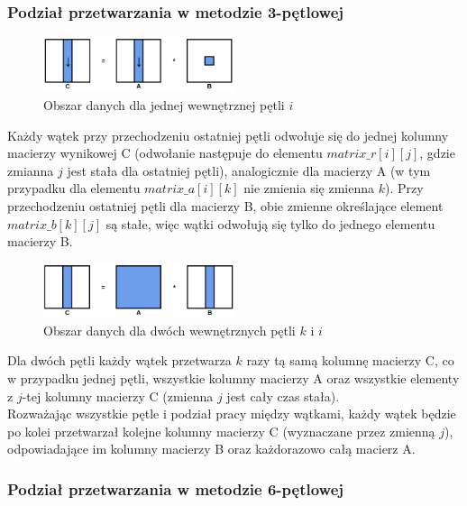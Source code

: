 \documentclass[10pt,a4paper]{article}
\begin{document}
\newpage

\subsubsection{Podział przetwarzania w metodzie 3-pętlowej}
\begin{figure}[h]
	\centering
	\includegraphics[width=0.5\textwidth]{3loops1.png}
	\caption{Obszar danych dla jednej wewnętrznej pętli $i$}
\end{figure}

Każdy wątek przy przechodzeniu ostatniej pętli odwołuje się do jednej kolumny macierzy wynikowej C (odwołanie następuje do elementu
$matrix\_r[i][j]$, gdzie zmianna $j$ jest stała dla ostatniej pętli), analogicznie dla macierzy A (w tym przypadku dla elementu $matrix\_a[i][k]$
nie zmienia się zmienna $k$). Przy przechodzeniu ostatniej pętli dla macierzy B, obie zmienne określające element $matrix\_b[k][j]$ są stałe, więc
wątki odwołują się tylko do jednego elementu macierzy B.

\begin{figure}[h]
	\centering
	\includegraphics[width=0.5\textwidth]{3loops2.png}
	\caption{Obszar danych dla dwóch wewnętrznych pętli $k$ i $i$}
\end{figure}

Dla dwóch pętli każdy wątek przetwarza $k$ razy tą samą kolumnę macierzy C, co w przypadku jednej pętli, wszystkie kolumny
macierzy A oraz wszystkie elementy z $j$-tej kolumny macierzy C (zmienna $j$ jest cały czas stała).\\

Rozważając wszystkie pętle i podział pracy między wątkami, każdy wątek będzie po kolei przetwarzał kolejne kolumny macierzy C (wyznaczane przez
zmienną $j$), odpowiadające im kolumny macierzy B oraz każdorazowo całą macierz A.

\newpage

\subsubsection{Podział przetwarzania w metodzie 6-pętlowej}
\end{document}
